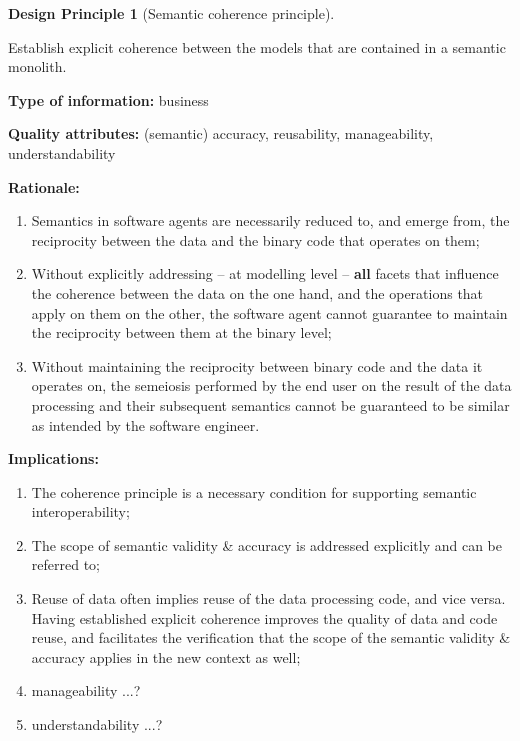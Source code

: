 \documentclass[a4paper,11pt,oneside,oldfontcommands]{memoir}
\theoremstyle{definition}
\theoremstyle{break}		%
\newtheorem{mmdp}{Design Principle}[chapter]
\numberwithin{equation}{chapter}
\numberwithin{figure}{chapter}
\begin{document}
\begin{mmdp}[Semantic coherence principle]\label{dp:semantic-coherence-principle}

Establish explicit coherence between the models that are contained in a semantic monolith.

\textbf{Type of information:} business

\textbf{Quality attributes:} (semantic) accuracy, reusability, manageability, understandability 

\textbf{Rationale:}
\begin{enumerate}
\item Semantics in software agents are necessarily reduced to, and emerge from, the reciprocity between the data and the binary code that operates on them;  
\item Without explicitly addressing -- at modelling level -- \textbf{all} facets that influence the coherence between the data on the one hand, and the operations that apply on them on the other, the software agent cannot guarantee to maintain the reciprocity between them at the binary level;
\item Without maintaining the reciprocity between binary code and the data it operates on, the semeiosis performed by the end user on the result of the data processing and their subsequent semantics cannot be guaranteed to be similar as intended by the software engineer.
\end{enumerate}
\textbf{Implications:}
\begin{enumerate}
\item The coherence principle is a necessary condition for supporting semantic interoperability;
\item The scope of semantic validity \& accuracy is addressed explicitly and can be referred to;
\item Reuse of data often implies reuse of the data processing code, and vice versa. Having established explicit coherence improves the quality of data and code reuse, and facilitates the verification that the scope of the semantic validity \& accuracy applies in the new context as well;
\item manageability ...?
\item understandability ...?
\end{enumerate}  
\end{mmdp}
\end{document}
